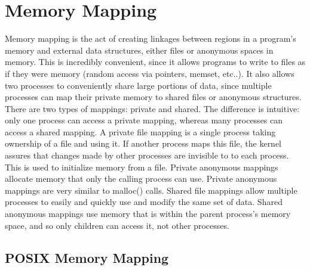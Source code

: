 \documentclass[11pt]{article}
\begin{document}
\section{Memory Mapping}
Memory mapping is the act of creating linkages between regions in a program's memory and external data structures, either files or anonymous spaces in memory. This is incredibly convenient, since it allows programs to write to files as if they were memory (random access via pointers, memset, etc..). It also allows two processes to conveniently share large portions of data, since multiple processes can map their private memory to shared files or anonymous structures. There are two types of mappings: private and shared. The difference is intuitive: only one process can access a private mapping, whereas many processes can access a shared mapping. A private file mapping is a single process taking ownership of a file and using it. If another process maps this file, the kernel assures that changes made by other processes are invisible to to each process. This is used to initialize memory from a file. Private anonymous mappings allocate memory that only the calling process can use. Private anonymous mappings are very similar to malloc() calls. Shared file mappings allow multiple processes to easily and quickly use and modify the same set of data. Shared anonymous mappings use memory that is within the parent process's memory space, and so only children can access it, not other processes.\\

\subsection{POSIX Memory Mapping}
\end{document}
